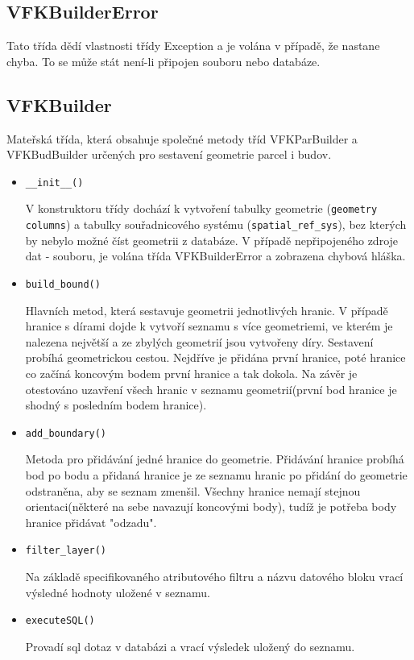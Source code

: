 \subsection{VFKBuilderError}
Tato třída dědí vlastnosti třídy Exception a je volána v případě, že nastane chyba. To se může stát není-li připojen  souboru nebo databáze.
\subsection{VFKBuilder}
Mateřská třída, která obsahuje společné metody tříd VFKParBuilder a VFKBudBuilder určených pro sestavení geometrie parcel i budov.
\begin{itemize}[leftmargin=50pt]
\item \verb|__init__()|
		
V konstruktoru třídy dochází k vytvoření tabulky geometrie (\verb|geometry columns|) a tabulky souřadnicového systému (\verb|spatial_ref_sys|), bez kterých by nebylo možné číst geometrii z databáze. V případě nepřipojeného zdroje dat -  souboru, je volána třída VFKBuilderError a zobrazena chybová hláška.
\item \verb|build_bound()|

Hlavních metod, která sestavuje geometrii jednotlivých hranic. V případě hranice s dírami dojde k vytvoří seznamu s více geometriemi, ve kterém je nalezena největší a ze zbylých geometrií jsou vytvořeny díry. Sestavení probíhá geometrickou cestou. Nejdříve je přidána první hranice, poté hranice co začíná koncovým bodem první hranice a tak dokola. Na závěr je otestováno uzavření všech hranic v seznamu geometrií(první bod hranice je shodný s posledním bodem hranice).
\item \verb|add_boundary()|

Metoda pro přidávání jedné hranice do geometrie. Přidávání hranice probíhá bod po bodu a přidaná hranice je ze seznamu hranic po přidání do geometrie odstraněna, aby se seznam zmenšil. Všechny hranice nemají stejnou orientaci(některé na sebe navazují koncovými body), tudíž je potřeba body hranice přidávat "odzadu".
\item \verb|filter_layer()|

Na základě specifikovaného atributového filtru a názvu datového bloku vrací výsledné hodnoty uložené v seznamu.
\item \verb|executeSQL()|

Provadí sql dotaz v databázi a vrací výsledek uložený do seznamu.

\end{itemize}
